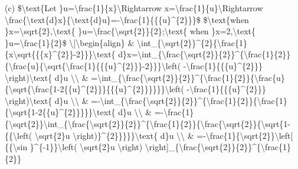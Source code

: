 \quad{} (c) \$\textbackslash text\{Let \}u=\textbackslash frac\{1\}\{x\}\textbackslash Rightarrow
x=\textbackslash frac\{1\}\{u\}\textbackslash Rightarrow \textbackslash frac\{\textbackslash text\{d\}x\}\{\textbackslash text\{d\}u\}=-\textbackslash frac\{1\}\{\{\{u\}\textasciicircum\{2\}\}\}\$
\$\textbackslash text\{when \}x=\textbackslash sqrt\{2\},\textbackslash text\{
\}u=\textbackslash frac\{\textbackslash sqrt\{2\}\}\{2\};\textbackslash text\{
when \}x=2,\textbackslash text\{ \}u=\textbackslash frac\{1\}\{2\}\$
\textbackslash{[}\textbackslash begin\{align\} \& \textbackslash int\_\{\textbackslash sqrt\{2\}\}\textasciicircum\{2\}\{\textbackslash frac\{1\}\{x\textbackslash sqrt\{\{\{x\}\textasciicircum\{2\}\}-2\}\}\}\textbackslash text\{
d\}x=\textbackslash int\_\{\textbackslash frac\{\textbackslash sqrt\{2\}\}\{2\}\}\textasciicircum\{\textbackslash frac\{1\}\{2\}\}\{\textbackslash frac\{u\}\{\textbackslash sqrt\{\textbackslash frac\{1\}\{\{\{u\}\textasciicircum\{2\}\}\}-2\}\}\}\textbackslash left(
-\textbackslash frac\{1\}\{\{\{u\}\textasciicircum\{2\}\}\} \textbackslash right)\textbackslash text\{
d\}u \textbackslash\textbackslash{} \& =\textbackslash int\_\{\textbackslash frac\{\textbackslash sqrt\{2\}\}\{2\}\}\textasciicircum\{\textbackslash frac\{1\}\{2\}\}\{\textbackslash frac\{u\}\{\textbackslash sqrt\{\textbackslash frac\{1-2\{\{u\}\textasciicircum\{2\}\}\}\{\{\{u\}\textasciicircum\{2\}\}\}\}\}\}\textbackslash left(
-\textbackslash frac\{1\}\{\{\{u\}\textasciicircum\{2\}\}\} \textbackslash right)\textbackslash text\{
d\}u \textbackslash\textbackslash{} \& =-\textbackslash int\_\{\textbackslash frac\{\textbackslash sqrt\{2\}\}\{2\}\}\textasciicircum\{\textbackslash frac\{1\}\{2\}\}\{\textbackslash frac\{1\}\{\textbackslash sqrt\{1-2\{\{u\}\textasciicircum\{2\}\}\}\}\}\textbackslash text\{
d\}u \textbackslash\textbackslash{} \& =-\textbackslash frac\{1\}\{\textbackslash sqrt\{2\}\}\textbackslash int\_\{\textbackslash frac\{\textbackslash sqrt\{2\}\}\{2\}\}\textasciicircum\{\textbackslash frac\{1\}\{2\}\}\{\textbackslash frac\{\textbackslash sqrt\{2\}\}\{\textbackslash sqrt\{1-\{\{\textbackslash left(
\textbackslash sqrt\{2\}u \textbackslash right)\}\textasciicircum\{2\}\}\}\}\}\textbackslash text\{
d\}u \textbackslash\textbackslash{} \& =-\textbackslash frac\{1\}\{\textbackslash sqrt\{2\}\}\textbackslash left{[}
\{\{\textbackslash sin \}\textasciicircum\{-1\}\}\textbackslash left(
\textbackslash sqrt\{2\}u \textbackslash right) \textbackslash right{]}\_\{\textbackslash frac\{\textbackslash sqrt\{2\}\}\{2\}\}\textasciicircum\{\textbackslash frac\{1\}\{2\}\}

